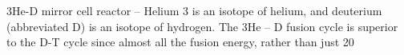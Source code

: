 \documentclass[a4paper]{book}
\begin{document}
3He-D mirror cell reactor – Helium 3 is an isotope of helium, and deuterium (abbreviated D) is an isotope of hydrogen.  The 3He – D fusion cycle is superior to the D-T cycle since almost all the fusion energy, rather than just 20%
 
\end{document}
